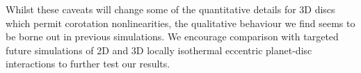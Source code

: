 Whilst these caveats will change some of the quantitative details for 3D discs which permit corotation nonlinearities, the qualitative behaviour we find seems to be borne out in previous simulations. We encourage comparison with targeted future simulations of 2D and 3D locally isothermal eccentric planet-disc interactions to further test our results.











